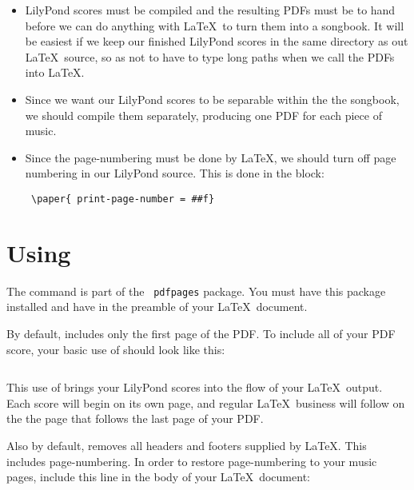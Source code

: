 \documentclass[../../LilyPond-Tutorials]{subfiles}
\begin{document}
\begin{itemize}

\item  LilyPond scores must be compiled and the resulting PDFs must be to hand before we can do anything with \LaTeX\ to turn them into a songbook. It will be easiest if we keep our finished LilyPond scores in the same directory as out \LaTeX\ source, so as not to have to type long paths when we call the PDFs into \LaTeX.  

\item  Since we want our LilyPond scores to be separable within the the songbook, we should compile them separately, producing one PDF for each piece of music.  

\item  Since the page-numbering must be done by \LaTeX, we should turn off page numbering in our LilyPond source. This is done in the  block:

\begin{verbatim} \paper{ print-page-number = ##f}  \end{verbatim}

\end{itemize}

\section*{Using }

The  command is part of the \texttt{ pdfpages} package. You must have this package installed and have  in the preamble of your \LaTeX\ document.

By default,  includes only the first page of the PDF. To include all of your PDF score, your basic use of  should look like this:

\begin{verbatim}  \end{verbatim}

This use of  brings your LilyPond scores into the flow of your \LaTeX\ output. Each score will begin on its own page, and regular \LaTeX\ business will follow on the the page that follows the last page of your PDF.

Also by default,  removes all headers and footers supplied by \LaTeX. This includes page-numbering. In order to restore page-numbering to your music pages, include this line in the body of your \LaTeX\ document:
\end{document}
